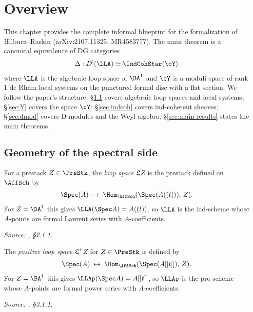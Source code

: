 \chapter{Overview}
\label{chap:overview}

This chapter provides the complete informal blueprint for the formalization of
Hilburn--Raskin \cite{hilburn-raskin} (arXiv:2107.11325, MR4583777).
The main theorem is a canonical equivalence of DG categories
\[
  \Delta : D^!(\LLA) \simeq \IndCohStar(\cY)
\]
where $\LLA$ is the algebraic loop space of $\BA^1$ and $\cY$ is a moduli
space of rank 1 de Rham local systems on the punctured formal disc with a
flat section. We follow the paper's structure: \S\ref{sec:loop-spaces} covers
algebraic loop spaces and local systems; \S\ref{sec:Y} covers the space $\cY$;
\S\ref{sec:indcoh} covers ind-coherent sheaves; \S\ref{sec:dmod} covers
D-modules and the Weyl algebra; \S\ref{sec:main-results} states the main theorems.

\section{Geometry of the spectral side}
\label{sec:loop-spaces}
\label{sec:Y}

\begin{definition}
  \label{def:loop-space}
  \uses{}
  For a prestack $Z \in \PreStk$, the \emph{loop space} $\mathfrak{L}Z$
  is the prestack defined on $\AffSch$ by
  \[
    \Spec(A) \;\mapsto\; \Hom_{\AffSch}(\Spec(A((t))),\, Z).
  \]
  For $Z = \BA^1$ this gives $\LLA(\Spec A) = A((t))$, so $\LLA$ is the
  ind-scheme whose $A$-points are formal Laurent series with $A$-coefficients.

  \textit{Source: \cite{hilburn-raskin}, \S2.1.1.}
\end{definition}

\begin{definition}
  \label{def:positive-loop-space}
  \uses{}
  The \emph{positive loop space} $\mathfrak{L}^+ Z$ for $Z \in \PreStk$
  is defined by
  \[
    \Spec(A) \;\mapsto\; \Hom_{\AffSch}(\Spec(A[[t]]),\, Z).
  \]
  For $Z = \BA^1$ this gives $\LLAp(\Spec A) = A[[t]]$, so $\LLAp$ is the
  pro-scheme whose $A$-points are formal power series with $A$-coefficients.

  \textit{Source: \cite{hilburn-raskin}, \S2.1.1.}
\end{definition}

